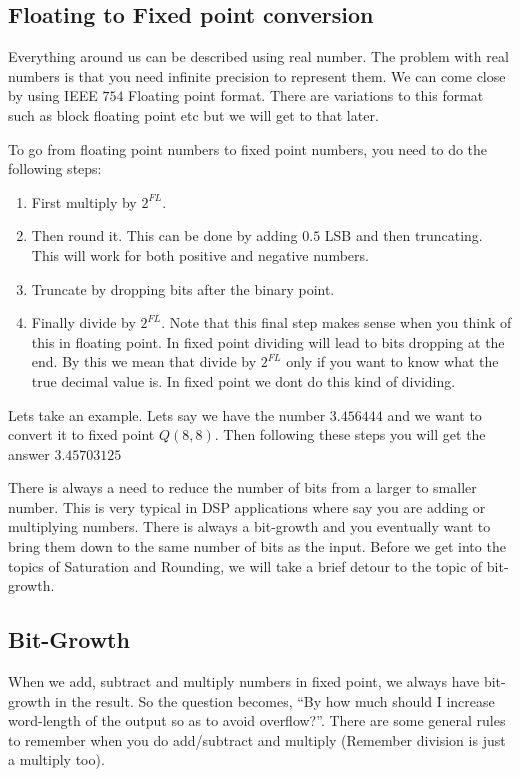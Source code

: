 \subsection{Floating to Fixed point conversion\cite{ucdavis_flt2fxp}}

Everything around us can be described using real number. The problem with real numbers is that you need infinite precision to represent them. We can come close by using IEEE $754$ Floating point format. There are variations to this format such as block floating point etc but we will get to that later. 

To go from floating point numbers to fixed point numbers, you need to do the following steps:
\begin{enumerate}
	\item First multiply by $2^{FL}$.
	\item Then round it. This can be done by adding $0.5$ LSB and then truncating. This will work for both positive and negative numbers.
	\item Truncate by dropping bits after the binary point.
	\item Finally divide by $2^{FL}$. Note that this final step makes sense when you think of this in floating point. In fixed point dividing will lead to bits dropping at the end. By this we mean that divide by $2^{FL}$ only if you want to know what the true decimal value is. In fixed point we dont do this kind of dividing.
\end{enumerate}

Lets take an example. Lets say we have the number $3.456444$ and we want to convert it to fixed point $Q(8, 8)$. Then following these steps you will get the answer $3.45703125$

There is always a need to reduce the number of bits from a larger to smaller number. This is very typical in DSP applications where say you are adding or multiplying numbers. There is always a bit-growth and you eventually want to bring them down to the same number of bits as the input. Before we get into the topics of Saturation and Rounding, we will take a brief detour to the topic of bit-growth.
 
\subsection{Bit-Growth \cite{zipcpu_bitgrowth}}

When we add, subtract and multiply numbers in fixed point, we always have bit-growth in the result. So the question becomes, ``By how much should I increase word-length of the output so as to avoid overflow?''. There are some general rules to remember when you do add/subtract and multiply (Remember division is just a multiply too). 

